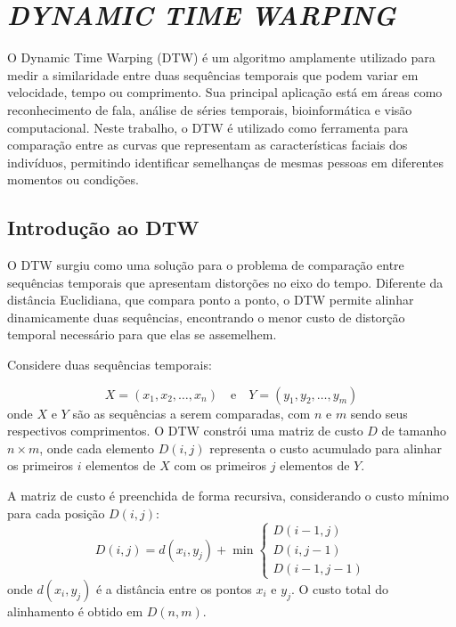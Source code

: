 \chapter{\textit{DYNAMIC TIME WARPING}} \label{cha:dtw}

O Dynamic Time Warping (DTW) é um algoritmo amplamente utilizado para medir a similaridade entre duas sequências temporais que podem variar em velocidade, tempo ou comprimento. Sua principal aplicação está em áreas como reconhecimento de fala, análise de séries temporais, bioinformática e visão computacional. Neste trabalho, o DTW é utilizado como ferramenta para comparação entre as curvas que representam as características faciais dos indivíduos, permitindo identificar semelhanças de mesmas pessoas em diferentes momentos ou condições.

\section{Introdução ao DTW}

O DTW surgiu como uma solução para o problema de comparação entre sequências temporais que apresentam distorções no eixo do tempo. Diferente da distância Euclidiana, que compara ponto a ponto, o DTW permite alinhar dinamicamente duas sequências, encontrando o menor custo de distorção temporal necessário para que elas se assemelhem.

Considere duas sequências temporais:

\begin{equation}
    X = (x_1, x_2, \ldots, x_n) \quad \text{e} \quad Y = (y_1, y_2, \ldots, y_m)
\end{equation}
onde \(X\) e \(Y\) são as sequências a serem comparadas, com \(n\) e \(m\) sendo seus respectivos comprimentos. O DTW constrói uma matriz de custo \(D\) de tamanho \(n \times m\), onde cada elemento \(D(i, j)\) representa o custo acumulado para alinhar os primeiros \(i\) elementos de \(X\) com os primeiros \(j\) elementos de \(Y\).

A matriz de custo é preenchida de forma recursiva, considerando o custo mínimo para cada posição \(D(i, j)\):
\begin{equation}
    D(i, j) = d(x_i, y_j) + \min \begin{cases}
        D(i-1, j) \\
        D(i, j-1) \\
        D(i-1, j-1)
    \end{cases}
\end{equation}
onde \(d(x_i, y_j)\) é a distância entre os pontos \(x_i\) e \(y_j\). O custo total do alinhamento é obtido em \(D(n, m)\).

